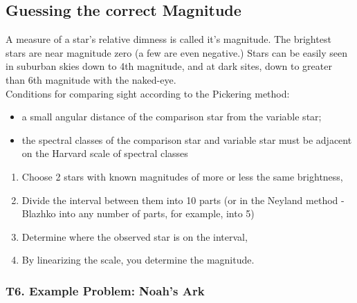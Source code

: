 \documentclass[a4paper,12pt]{extarticle}
\begin{document}

\subsection{Guessing the correct Magnitude}

A measure of a star's relative dimness is called it's magnitude. The brightest stars are near magnitude zero (a few are even negative.) Stars can be easily seen in suburban skies down to 4th magnitude, and at dark sites, down to greater than 6th magnitude with the naked-eye.\\

Conditions for comparing sight according to the Pickering method:
\begin{itemize}
	\itemsep0em
	\item a small angular distance of the comparison star from the variable star;
	\item the spectral classes of the comparison star and variable star must be adjacent on the Harvard scale of spectral classes
\end{itemize}

\begin{enumerate}
	\itemsep0em 
	\item Choose 2 stars with known magnitudes of more or less the same brightness,
	\item  Divide the interval between them into 10 parts (or in the Neyland method - Blazhko into any number of parts, for example, into 5)
	\item Determine where the observed star is on the interval,
	\item By linearizing the scale, you determine the magnitude.
\end{enumerate}


\subsubsection*{T6. Example Problem: Noah's Ark}
\end{document}

